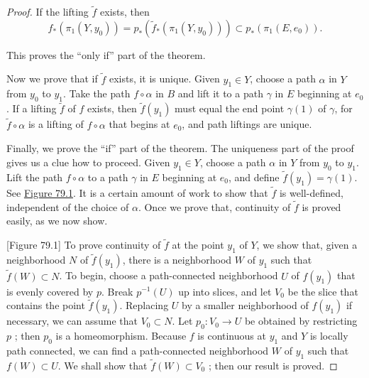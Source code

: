 \begin{proof}
	If the lifting \(\widetilde{f}\) exists, then
\[
f_{ * }( {{\pi }_{1}( {Y,y_{0}}) }) = p_{ * }( {\widetilde{f}_{ * }( {{\pi }_{1}( {Y,y_{0}}) }) }) \subset {p}_{ * }( {{\pi }_{1}( {E,e_{0}}) }).
\]

This proves the ``only if'' part of the theorem.

Now we prove that if \(\widetilde{f}\) exists, it is unique. Given \(y_{1} \in Y\), choose a path \(\alpha\) in \(Y\) from \(y_{0}\) to \(y_{1}\). Take the path \(f \circ \alpha\) in \(B\) and lift it to a path \(\gamma\) in \(E\) beginning at \(e_{0}\). If a lifting \(\widetilde{f}\) of \(f\) exists, then \(\widetilde{f}( y_{1})\) must equal the end point \(\gamma (1)\) of \(\gamma\), for \(\widetilde{f} \circ \alpha\) is a lifting of \(f \circ \alpha\) that begins at \(e_{0}\), and path liftings are unique.

Finally, we prove the ``if'' part of the theorem. The uniqueness part of the proof gives us a clue how to proceed. Given \(y_{1} \in Y\), choose a path \(\alpha\) in \(Y\) from \(y_{0}\) to \(y_{1}\). Lift the path \(f \circ \alpha\) to a path \(\gamma\) in \(E\) beginning at \(e_{0}\), and define \(\widetilde{f}( y_{1}) = \gamma (1)\). See \hyperref[fig:79.1]{Figure 79.1}. It is a certain amount of work to show that \(\widetilde{f}\) is well-defined, independent of the choice of \(\alpha\). Once we prove that, continuity of \(\widetilde{f}\) is proved easily, as we now show.

[Figure 79.1]
To prove continuity of \(\widetilde{f}\) at the point \(y_{1}\) of \(Y\), we show that, given a neighborhood \(N\) of \(\widetilde{f}( y_{1})\), there is a neighborhood \(W\) of \(y_{1}\) such that \(\widetilde{f}( W) \subset N\). To begin, choose a path-connected neighborhood \(U\) of \(f( y_{1})\) that is evenly covered by \(p\). Break \(p^{-1}( U)\) up into slices, and let \(V_{0}\) be the slice that contains the point \(\widetilde{f}( y_{1})\). Replacing \(U\) by a smaller neighborhood of \(f( y_{1})\) if necessary, we can assume that \(V_{0} \subset N\). Let \(p_{0} : V_{0} \rightarrow U\) be obtained by restricting \(p\) ; then \(p_{0}\) is a homeomorphism. Because \(f\) is continuous at \(y_{1}\) and \(Y\) is locally path connected, we can find a path-connected neighborhood \(W\) of \(y_{1}\) such that \(f( W) \subset U\). We shall show that \(\widetilde{f}( W) \subset {V}_{0}\) ; then our result is proved.


\end{proof}
